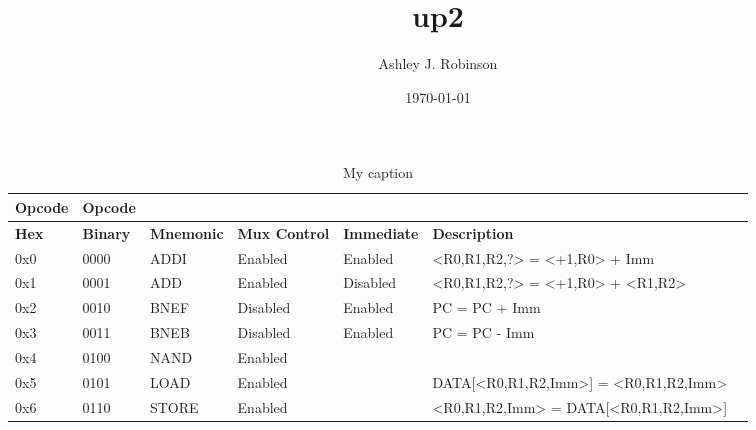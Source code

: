 \documentclass[a4paper]{article}
\title{up2}
\author{Ashley J. Robinson}
\date{\today}
\begin{document}
\maketitle

\section{}


\begin{table}[]
    \centering
    \caption{My caption}
    \label{my-label}
    \begin{tabular}{|l|l|l|l|l|l|l|}
        \hline
        \textbf{Opcode}     &   \textbf{Opcode} &                       &                           &                       &                                       &           \\ \hline
        \textbf{Hex}        &   \textbf{Binary} &   \textbf{Mnemonic}   &   \textbf{Mux Control}    &   \textbf{Immediate}  &   \textbf{Description}                &           \\ \hline
        0x0                 &   0000            &   ADDI                &   Enabled                 &   Enabled             &   <R0,R1,R2,?> = <+1,R0> + Imm        &           \\ \hline
        0x1                 &   0001            &   ADD                 &   Enabled                 &   Disabled            &   <R0,R1,R2,?> = <+1,R0> + <R1,R2>    &           \\ \hline
        0x2                 &   0010            &   BNEF                &   Disabled                &   Enabled             &   PC = PC + Imm           &           \\ \hline
        0x3                 &   0011            &   BNEB                &   Disabled                &   Enabled             &   PC = PC - Imm           &           \\ \hline
        0x4                 &   0100            &   NAND                &   Enabled                 &           &           &           \\ \hline
        0x5                 &   0101            &   LOAD                &   Enabled                 &                       &   DATA[<R0,R1,R2,Imm>] = <R0,R1,R2,Imm>           &           \\ \hline
        0x6                 &   0110            &   STORE               &   Enabled                 &                       &   <R0,R1,R2,Imm> = DATA[<R0,R1,R2,Imm>]           &           \\ \hline

\end{tabular}
\end{table}
\end{document}
